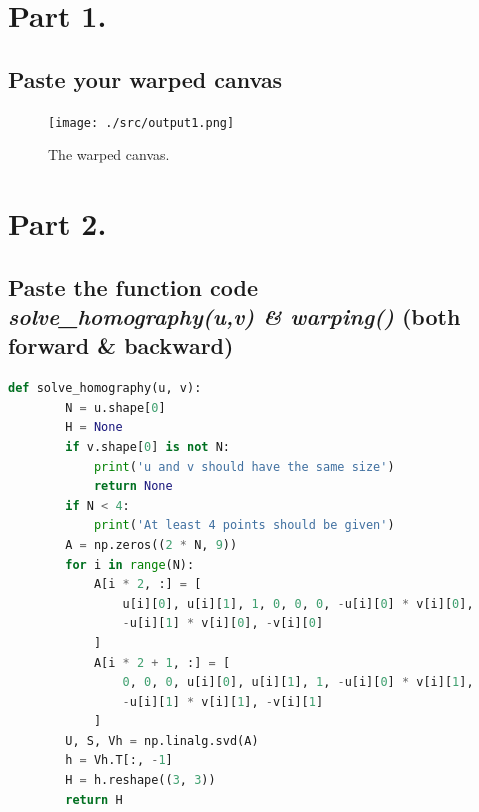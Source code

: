 \documentclass[a4paper, 12pt]{article}
\begin{document}
\section{Part 1.}
\subsection{Paste your warped canvas}

\begin{figure}[H]
    \centering
    \texttt{[image: ./src/output1.png]}
    \caption{The warped canvas.}
    \label{fig:part1}
\end{figure}

\section{Part 2.}
\subsection{Paste the function code \emph{solve\_homography(u,v) \& warping()} (both forward \& backward)}

\begin{lstlisting}[language=python]
    def solve_homography(u, v):
        N = u.shape[0]
        H = None
        if v.shape[0] is not N:
            print('u and v should have the same size')
            return None
        if N < 4:
            print('At least 4 points should be given')
        A = np.zeros((2 * N, 9))
        for i in range(N):
            A[i * 2, :] = [
                u[i][0], u[i][1], 1, 0, 0, 0, -u[i][0] * v[i][0],
                -u[i][1] * v[i][0], -v[i][0]
            ]
            A[i * 2 + 1, :] = [
                0, 0, 0, u[i][0], u[i][1], 1, -u[i][0] * v[i][1],
                -u[i][1] * v[i][1], -v[i][1]
            ]
        U, S, Vh = np.linalg.svd(A)
        h = Vh.T[:, -1]
        H = h.reshape((3, 3))
        return H    
\end{lstlisting}
\end{document}
